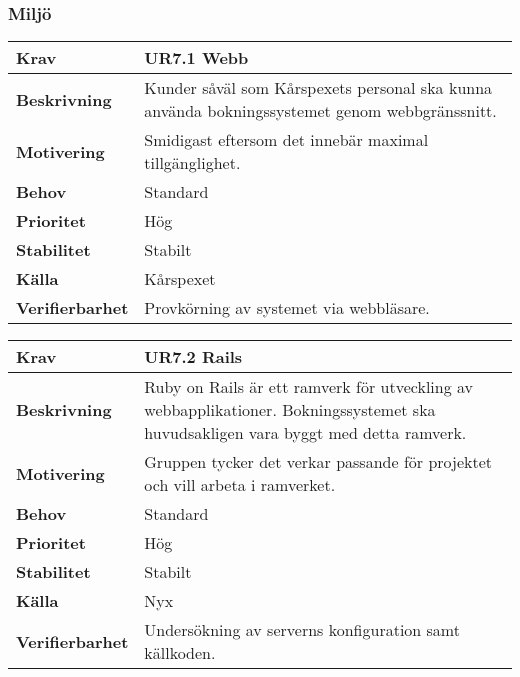 \documentclass[a4paper, twoside, 11pt, titlepage]{article}
\begin{document}
		\subsubsection{Miljö}


		\begin {table} [ht] \begin{tabular} { p{2.6cm} p{12.5cm} }
			\hline
			{\sffamily\textbf{Krav}} & {\sffamily\textbf{UR7.1 Webb}} \\
			\hline
			{\sffamily\textbf{Beskrivning}} & {Kunder såväl som Kårspexets personal ska kunna använda bokningssystemet genom webbgränssnitt.} \\
			\hline
			{\sffamily\textbf{Motivering}} & {Smidigast eftersom det innebär maximal tillgänglighet.} \\
			\hline
			{\sffamily\textbf{Behov}} & {Standard} \\
			\hline
			{\sffamily\textbf{Prioritet}} & {Hög} \\
			\hline
			{\sffamily\textbf{Stabilitet}} & {Stabilt} \\
			\hline
			{\sffamily\textbf{Källa}} & {Kårspexet} \\
			\hline
			{\sffamily\textbf{Verifierbarhet}} & {Provkörning av systemet via webbläsare.} \\
			\hline
		\end{tabular} \end{table} \FloatBarrier
		\vspace{6mm}

		\begin {table} [ht] \begin{tabular} { p{2.6cm} p{12.5cm} }
			\hline
			{\sffamily\textbf{Krav}} & {\sffamily\textbf{UR7.2 Rails}} \\
			\hline
			{\sffamily\textbf{Beskrivning}} & {Ruby on Rails är ett ramverk för utveckling av webbapplikationer. Bokningssystemet ska huvudsakligen vara byggt med detta ramverk.} \\
			\hline
			{\sffamily\textbf{Motivering}} & {Gruppen tycker det verkar passande för projektet och vill arbeta i ramverket.} \\
			\hline
			{\sffamily\textbf{Behov}} & {Standard} \\
			\hline
			{\sffamily\textbf{Prioritet}} & {Hög} \\
			\hline
			{\sffamily\textbf{Stabilitet}} & {Stabilt} \\
			\hline
			{\sffamily\textbf{Källa}} & {Nyx} \\
			\hline
			{\sffamily\textbf{Verifierbarhet}} & {Undersökning av serverns konfiguration samt källkoden.} \\
			\hline
		\end{tabular} \end{table} \FloatBarrier
		\vspace{6mm}
\end{document}
